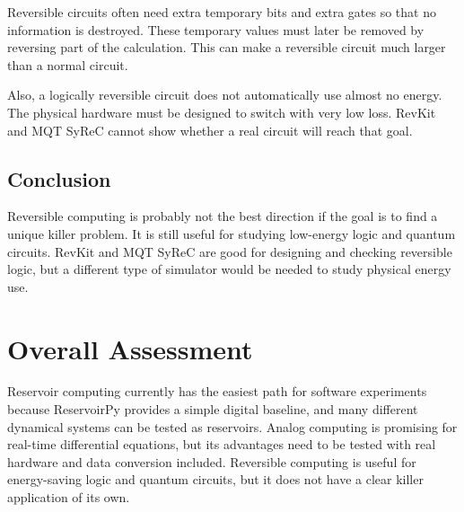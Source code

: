 \documentclass{article}
\begin{document}
Reversible circuits often need extra temporary bits and extra gates so that no information is destroyed. These temporary values must later be removed by reversing part of the calculation. This can make a reversible circuit much larger than a normal circuit.

Also, a logically reversible circuit does not automatically use almost no energy. The physical hardware must be designed to switch with very low loss. RevKit and MQT SyReC cannot show whether a real circuit will reach that goal.

\subsection{Conclusion}

Reversible computing is probably not the best direction if the goal is to find a unique killer problem. It is still useful for studying low-energy logic and quantum circuits. RevKit and MQT SyReC are good for designing and checking reversible logic, but a different type of simulator would be needed to study physical energy use.


\section{Overall Assessment}

Reservoir computing currently has the easiest path for software experiments because ReservoirPy provides a simple digital baseline, and many different dynamical systems can be tested as reservoirs. Analog computing is promising for real-time differential equations, but its advantages need to be tested with real hardware and data conversion included. Reversible computing is useful for energy-saving logic and quantum circuits, but it does not have a clear killer application of its own.
\end{document}
